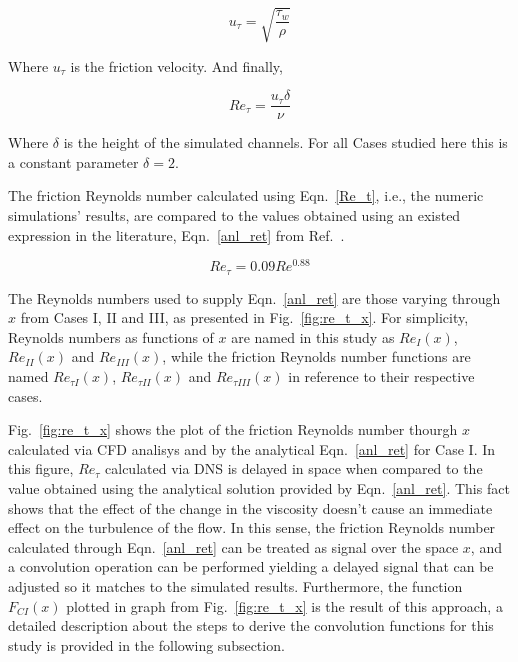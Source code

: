 \documentclass[twocolumn,10pt]{asme2e}
\begin{document}
\begin{equation}
u_{\tau} = \sqrt{\frac{{\tau}_w}{\rho}}
\label{u_t}
\end{equation}

Where \(u_{\tau}\) is the friction velocity. And finally,

\begin{equation}
Re_{\tau} = \frac{u_{\tau}\delta}{\nu}
\label{Re_t}
\end{equation}

Where \(\delta\) is the height of the simulated channels. For all Cases studied here this is a constant parameter \(\delta=2\).

The friction Reynolds number calculated using Eqn.~\ref{Re_t}, i.e., the numeric simulations' results, are compared to the values obtained using an existed expression in the literature, Eqn.~\ref{anl_ret} from Ref.~\cite{pope}.

\begin{equation}
Re_{\tau} = 0.09Re^{0.88}
\label{anl_ret}
\end{equation}

The Reynolds numbers used to supply Eqn.~\ref{anl_ret} are those varying through \(x\) from Cases I, II and III, as presented in Fig.~\ref{fig:re_t_x}. For simplicity, Reynolds numbers as functions of \(x\) are named in this study as \(Re_{I}(x)\), \(Re_{II}(x)\) and \(Re_{III}(x)\), while the friction Reynolds number functions are named \(Re_{{\tau}I}(x)\), \(Re_{{\tau}II}(x)\) and \(Re_{{\tau}III}(x)\) in reference to their respective cases.

Fig.~\ref{fig:re_t_x} shows the plot of the friction Reynolds number thourgh \(x\) calculated via CFD analisys and by the analytical Eqn.~\ref{anl_ret} for Case I. In this figure, \(Re_{\tau}\) calculated via DNS is delayed in space when compared to the value obtained using the analytical solution provided by Eqn.~\ref{anl_ret}. This fact shows that the effect of the change in the viscosity doesn't cause an immediate effect on the turbulence of the flow. In this sense, the friction Reynolds number calculated through Eqn.~\ref{anl_ret} can be treated as signal over the space \(x\), and a convolution operation can be performed yielding a delayed signal that can be adjusted so it matches to the simulated results. Furthermore, the function \(F_{CI}(x)\) plotted in graph from Fig.~\ref{fig:re_t_x} is the result of this approach, a detailed description about the steps to derive the convolution functions for this study is provided in the following subsection.
\end{document}

